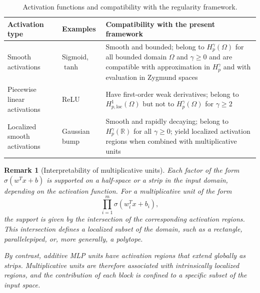 \documentclass[11pt,reqno]{amsart}
\numberwithin{equation}{section}
\newtheorem{remark}[theorem]{\bf{Remark}}
\theoremstyle{remark}
\theoremstyle{definition}
\begin{document}
\begin{table}[ht]
\centering
\caption{Activation functions and compatibility with the regularity framework.}
\label{tab:activation-choice}
\begin{tabular}{p{3.8cm} p{3.5cm} p{6.2cm}}
\hline
Activation type & Examples & Compatibility with the present framework \\
\hline
Smooth activations
& Sigmoid, $\tanh$
& Smooth and bounded; belong to $H_p^\gamma(\Omega)$ for all bounded domain $\Omega$ and $\gamma\geq 0$ and are
compatible with approximation in $H_p^\gamma$ and with evaluation in Zygmund spaces \\
\hline
Piecewise linear activations
& ReLU
& Have first-order weak derivatives; belong to $H^1_{p,\mathrm{loc}}(\Omega)$ but not to
$H_p^\gamma(\Omega)$ for $\gamma\geq 2$ \\
\hline
Localized smooth activations
& Gaussian bump
& Smooth and rapidly decaying; belong to $H_p^\gamma(\mathbb{R})$ for all $\gamma\ge 0$; yield
localized activation regions when combined with multiplicative units \\
\hline
\end{tabular}
\end{table}





\begin{remark}[Interpretability of multiplicative units]
Each factor of the form $\sigma(w^T x + b)$ is supported on a half-space or a strip in the
input domain, depending on the activation function.
For a multiplicative unit of the form
\[
\prod_{i=1}^{m} \sigma(w_i^T x + b_i),
\]
the support is given by the intersection of the corresponding activation regions.
This intersection defines a localized subset of the domain, such as a rectangle,
parallelepiped, or, more generally, a polytope.

By contrast, additive MLP units have activation regions that extend globally as strips.
Multiplicative units are therefore associated with intrinsically localized regions, and the
contribution of each block is confined to a specific subset of the input space.
\end{remark}
\end{document}
